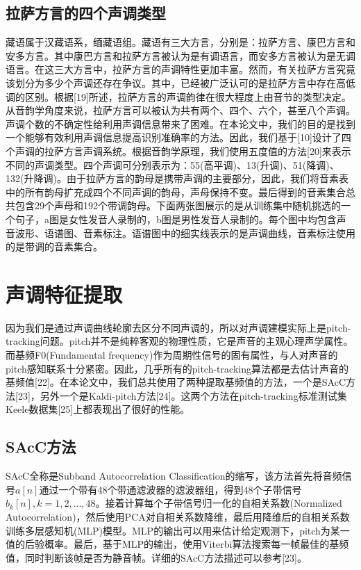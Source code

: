 \subsection{拉萨方言的四个声调类型}
藏语属于汉藏语系，缅藏语组。藏语有三大方言，分别是：拉萨方言、康巴方言和安多方言。其中康巴方言和拉萨方言被认为是有调语言，而安多方言被认为是无调语言。在这三大方言中，拉萨方言的声调特性更加丰富。然而，有关拉萨方言究竟该划分为多少个声调还存在争议。其中，已经被广泛认可的是拉萨方言中存在高低调的区别。根据[19]所述，拉萨方言的声调韵律在很大程度上由音节的类型决定。从音韵学角度来说，拉萨方言可以被认为共有两个、四个、六个，甚至八个声调。声调个数的不确定性给利用声调信息带来了困难。在本论文中，我们的目的是找到一个能够有效利用声调信息提高识别准确率的方法。因此，我们基于[10]设计了四个声调的拉萨方言声调系统。根据音韵学原理，我们使用五度值的方法[20]来表示不同的声调类型。四个声调可分别表示为：55(高平调)、13(升调)、51(降调)、132(升降调)。由于拉萨方言的韵母是携带声调的主要部分，因此，我们将音素表中的所有韵母扩充成四个不同声调的韵母，声母保持不变。最后得到的音素集合总共包含29个声母和192个带调韵母。下面两张图展示的是从训练集中随机挑选的一个句子，a图是女性发音人录制的，b图是男性发音人录制的。每个图中均包含声音波形、语谱图、音素标注。语谱图中的细实线表示的是声调曲线，音素标注使用的是带调的音素集合。{\color{red}{补充期刊论文图5}}
\section{声调特征提取}
因为我们是通过声调曲线轮廓去区分不同声调的，所以对声调建模实际上是pitch-tracking问题。pitch并不是纯粹客观的物理性质，它是声音的主观心理声学属性。而基频F0(Fundamental frequency)作为周期性信号的固有属性，与人对声音的pitch感知联系十分紧密。因此，几乎所有的pitch-tracking算法都是去估计声音的基频值[22]。在本论文中，我们总共使用了两种提取基频值的方法，一个是SAcC方法[23]，另外一个是Kaldi-pitch方法[24]。这两个方法在pitch-tracking标准测试集Keele数据集[25]上都表现出了很好的性能。
\subsection{SAcC方法}
SAcC全称是Subband Autocorrelation Classification的缩写，该方法首先将音频信号$a[n]$通过一个带有48个带通滤波器的滤波器组，得到48个子带信号$b_k[n],k=1,2,...,48$。接着计算每个子带信号归一化的自相关系数(Normalized Autocorrelation)，然后使用PCA对自相关系数降维，最后用降维后的自相关系数训练多层感知机(MLP)模型。MLP的输出可以用来估计给定观测下，pitch为某一值的后验概率。最后，基于MLP的输出，使用Viterbi算法搜索每一帧最佳的基频值，同时判断该帧是否为静音帧。详细的SAcC方法描述可以参考[23]。
